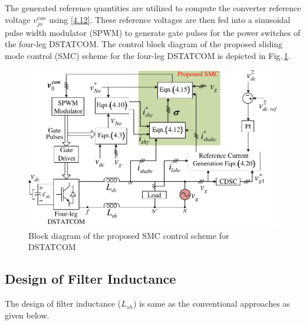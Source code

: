 The generated reference quantities are utilized to compute the converter reference voltage  $v^{con}_{jo}$ using \eqref{4.12}. These reference voltages are then fed into a sinusoidal pulse width modulator (SPWM) to generate gate pulses for the power switches of the four-leg DSTATCOM. The control block diagram of the proposed sliding mode control (SMC) scheme for the four-leg DSTATCOM is depicted in Fig.\,\ref{fig4.6}.
\begin{figure}[t!]
	\centering
	\includegraphics[scale=1]{figures/Chapter_4/Mine/Control_Diagram.pdf}
	\caption{Block diagram of the proposed SMC control scheme for DSTATCOM} 
	\label{fig4.6}
\end{figure} 

\vspace*{-0.5cm}
\subsection{Design of Filter Inductance}
The design of filter inductance ($L_{sh}$) is same as the conventional approaches as given below.

